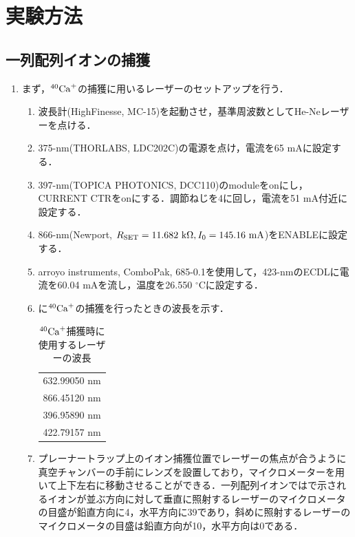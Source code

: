 \chapter{実験方法}
\section{一列配列イオンの捕獲}
\begin{enumerate}
\item まず，$^{40}{\rm Ca}^+$の捕獲に用いるレーザーのセットアップを行う．
\begin{enumerate}
\item 波長計(HighFinesse, MC-15)を起動させ，基準周波数としてHe-Neレーザーを点ける．
\item 375-nm(THORLABS, LDC202C)の電源を点け，電流を65 mAに設定する．
\item 397-nm(TOPICA PHOTONICS, DCC110)のmoduleをonにし，CURRENT CTRをonにする．調節ねじを4に回し，電流を51 mA付近に設定する．
\item 866-nm(Newport, $R_{\rm SET} = 11.682 \ {\rm k}\Omega , I_{0} = 145.16 \ {\rm mA}$)をENABLEに設定する．
\item arroyo instruments, ComboPak, 685-0.1を使用して，423-nmのECDLに電流を60.04 mAを流し，温度を26.550 $^{\circ}$Cに設定する．
\item {}に$^{40}{\rm Ca}^+$の捕獲を行ったときの波長を示す．

\begin{table}[h]
	\centering
		\caption{$^{40}{\rm Ca}^+$捕獲時に使用するレーザーの波長}
		\label{tab:use_laser_wavelength}
		\begin{tabular}{c}\hline \hline
			632.99050 nm \\
			866.45120 nm \\
			396.95890 nm \\
			422.79157 nm \\ \hline
		\end{tabular}
\end{table}

\item プレーナートラップ上のイオン捕獲位置でレーザーの焦点が合うように真空チャンバーの手前にレンズを設置しており，マイクロメーターを用いて上下左右に移動させることができる．一列配列イオンではで示されるイオンが並ぶ方向に対して垂直に照射するレーザーのマイクロメータの目盛が鉛直方向に4，水平方向に39であり，斜めに照射するレーザーのマイクロメータの目盛は鉛直方向が10，水平方向は0である．


\end{enumerate}
\end{enumerate}
